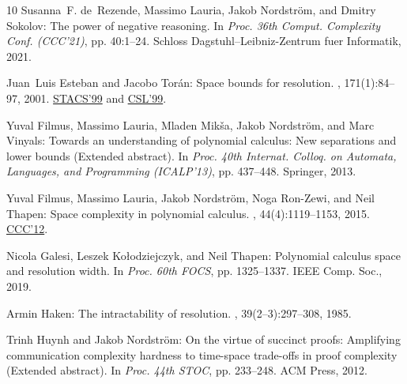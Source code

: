 \documentclass[11pt]{article}
\numberwithin{equation}{section}
\theoremstyle{definition}
\theoremstyle{plain}
\begin{document}
\begin{thebibliography}{10}
{\sc Susanna~F. de~Rezende, Massimo Lauria, Jakob Nordstr\"om, and Dmitry
  Sokolov}: The power of negative reasoning.
\newblock In {\em Proc. 36th Comput. Complexity Conf. (CCC'21)}, pp. 40:1--24.
  Schloss Dagstuhl--Leibniz-Zentrum fuer Informatik, 2021.

{\sc Juan~Luis Esteban and Jacobo Tor\'an}: Space bounds for resolution.
, 171(1):84--97, 2001.
\newblock \prelim \href{https://doi.org/10.1007/3-540-49116-3\_52}{STACS'99}
  and \href{https://doi.org/10.1007/3-540-48168-0\_26}{CSL'99}.

{\sc Yuval Filmus, Massimo Lauria, Mladen Mik\v{s}a, Jakob Nordstr\"om, and
  Marc Vinyals}: Towards an understanding of polynomial calculus: {N}ew
  separations and lower bounds ({E}xtended abstract).
\newblock In {\em Proc. 40th Internat. Colloq. on Automata, Languages, and
  Programming (ICALP'13)}, pp. 437--448. Springer, 2013.
\newblock [\epfmtdoi{10.1007/978-3-642-39206-1\_37}]

{\sc Yuval Filmus, Massimo Lauria, Jakob Nordström, Noga Ron-Zewi, and Neil
  Thapen}: Space complexity in polynomial calculus.
, 44(4):1119--1153, 2015.
\newblock \prelim \href{https://doi.org/10.1109/CCC.2012.27}{CCC'12}.
\newblock [\epfmtdoi{10.1137/120895950}]

{\sc Nicola Galesi, Leszek Kołodziejczyk, and Neil Thapen}: Polynomial
  calculus space and resolution width.
\newblock In {\em Proc. 60th FOCS}, pp. 1325--1337. IEEE Comp. Soc., 2019.

{\sc Armin Haken}: The intractability of resolution.
, 39(2--3):297--308, 1985.
\newblock [\epfmtdoi{10.1016/0304-3975(85)90144-6}]

{\sc Trinh Huynh and Jakob Nordstr\"om}: On the virtue of succinct proofs:
  Amplifying communication complexity hardness to time-space trade-offs in
  proof complexity ({E}xtended abstract).
\newblock In {\em Proc. 44th STOC}, pp. 233--248. ACM Press, 2012.
\newblock [\epfmtdoi{10.1145/2213977.2214000}]


\end{thebibliography}
\end{document}

